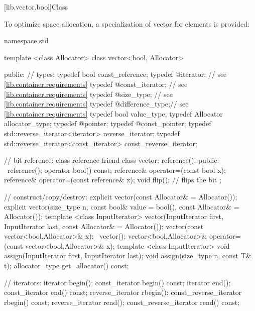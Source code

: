 [lib.vector.bool]{Class }

\pnum
{}%
To optimize space allocation, a specialization of vector for
elements is provided:

\begin{codeblock}
namespace std {
  template <class Allocator> class vector<bool, Allocator> {
  public:
    // types:
    typedef bool                                  const_reference;
    typedef @\impdef@                iterator;       // see \ref{lib.container.requirements}
    typedef @\impdef@                const_iterator; // see \ref{lib.container.requirements}
    typedef @\impdef@                size_type;      // see \ref{lib.container.requirements}
    typedef @\impdef@                difference_type;// see \ref{lib.container.requirements}
    typedef bool                                  value_type;
    typedef Allocator                             allocator_type;
    typedef @\impdef@                pointer;
    typedef @\impdef@                const_pointer;
    typedef std::reverse_iterator<iterator>       reverse_iterator;
    typedef std::reverse_iterator<const_iterator> const_reverse_iterator;

    // bit reference:
    class reference {
      friend class vector;
      reference();
    public:
     ~reference();
      operator bool() const;
      reference& operator=(const bool x);
      reference& operator=(const reference& x);
      void flip();              // flips the bit
    };

    // construct/copy/destroy:
    explicit vector(const Allocator& = Allocator());
    explicit vector(size_type n, const bool& value = bool(),
                    const Allocator& = Allocator());
    template <class InputIterator>
      vector(InputIterator first, InputIterator last,
        const Allocator& = Allocator());
    vector(const vector<bool,Allocator>& x);
   ~vector();
    vector<bool,Allocator>& operator=(const vector<bool,Allocator>& x);
    template <class InputIterator>
      void assign(InputIterator first, InputIterator last);
    void assign(size_type n, const T& t);
    allocator_type get_allocator() const;

    // iterators:
    iterator               begin();
    const_iterator         begin() const;
    iterator               end();
    const_iterator         end() const;
    reverse_iterator       rbegin();
    const_reverse_iterator rbegin() const;
    reverse_iterator       rend();
    const_reverse_iterator rend() const;

}}
\end{codeblock}
